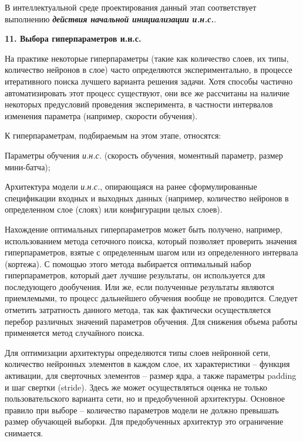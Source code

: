 В интеллектуальной среде проектирования данный этап соответствует выполнению \textbf{\textit{действия начальной инициализации и.н.с.}}.


\textbf{11. Выбора гиперпараметров и.н.с.}

На практике некоторые гиперпараметры (такие как количество слоев, их типы, количество нейронов в слое) часто определяются экспериментально, в процессе итеративного поиска лучшего варианта решения задачи. Хотя способы частично автоматизировать этот процесс существуют, они все же рассчитаны на наличие некоторых предусловий проведения эксперимента, в частности интервалов изменения параметра (например, скорости обучения).

К гиперпараметрам, подбираемым на этом этапе, относятся:
\begin{textitemize}
	\item Параметры обучения \textit{и.н.с.} (скорость обучения, моментный параметр, размер мини-батча);
	\item Архитектура модели \textit{и.н.с.}, опирающаяся на ранее сформулированные спецификации входных и выходных данных (например, количество нейронов в определенном слое (слоях) или конфигурации целых слоев).
\end{textitemize}

Нахождение оптимальных гиперпараметров может быть получено, например, использованием метода сеточного поиска, который позволяет проверить значения гиперпараметров, взятые с определенным шагом или из определенного интервала (кортежа). С помощью этого метода выбирается оптимальный набор гиперпараметров, который дает лучшие результаты, он используется для последующего дообучения. Или же, если полученные результаты являются приемлемыми, то процесс дальнейшего обучения вообще не проводится. Следует отметить затратность данного метода, так как фактически осуществляется перебор различных значений параметров обучения. Для снижения объема работы применяется метод случайного поиска.

Для оптимизации архитектуры определяются типы слоев нейронной сети, количество нейронных элементов в каждом слое, их характеристики -- функция активации, для сверточных элементов -- размер ядра, а также параметры padding и шаг свертки (stride).
Здесь же может осуществляться оценка не только пользовательского варианта сети, но и предобученной архитектуры. Основное правило при выборе -- количество параметров модели не должно превышать размер обучающей выборки. Для предобученных архитектур это ограничение снимается.

